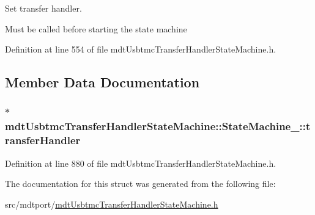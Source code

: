 Set transfer handler. 

Must be called before starting the state machine 

Definition at line 554 of file mdt\-Usbtmc\-Transfer\-Handler\-State\-Machine.\-h.



\subsection{Member Data Documentation}
\hypertarget{structmdt_usbtmc_transfer_handler_state_machine_1_1_state_machine___aa53bebaa070a0d20827225782efbcf1a}{
\subsubsection[{transfer\-Handler}]{$\ast$ mdt\-Usbtmc\-Transfer\-Handler\-State\-Machine\-::\-State\-Machine\-\_\-\-::transfer\-Handler}}\label{structmdt_usbtmc_transfer_handler_state_machine_1_1_state_machine___aa53bebaa070a0d20827225782efbcf1a}


Definition at line 880 of file mdt\-Usbtmc\-Transfer\-Handler\-State\-Machine.\-h.



The documentation for this struct was generated from the following file\-:\begin{DoxyCompactItemize}
\item 
src/mdtport/\hyperlink{mdt_usbtmc_transfer_handler_state_machine_8h}{mdt\-Usbtmc\-Transfer\-Handler\-State\-Machine.\-h}\end{DoxyCompactItemize}
